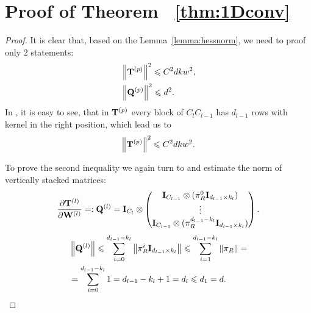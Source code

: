 \documentclass[conference]{IEEEtran}
\begin{document}
\section{Proof of Theorem ~\ref{thm:1Dconv}}\label{app:thm:1Dconv}
\begin{proof}
It is clear that, based on the Lemma~\ref{lemma:hessnorm}, we need to proof only 2 statements:
\begin{align*}
 & \left\|\mathbf{T}^{(p)}\right\|^2 \leqslant C^2dkw^2, \\
 &\left\|\mathbf{Q}^{(p)}\right\|^2 \leqslant d^2.
\end{align*}
In \cite{singh2023hessianperspectivenatureconvolutional}, it is easy to see, that in $\mathbf{T}^{(p)}$ every block of $C_lC_{l-1}$ has $d_{l-1}$ rows with kernel in the right position, which lead us to 
\[\left\|\mathbf{T}^{(p)}\right\|^2 \leqslant C^2dkw^2.\]

To prove the second inequality we again turn to \cite{singh2023hessianperspectivenatureconvolutional} and estimate the norm of vertically stacked matrices: \\
\[\frac{\partial \mathbf{T}^{(l)}}{\partial \mathbf{W}^{(l)}} =: \mathbf{Q}^{(l)} = \mathbf{I}_{C_l} \otimes
    \begin{pmatrix}
        \mathbf{I}_{C_{l-1}} \otimes (\pi_R^0\mathbf{I}_{d_{l-1} \times k_l}) \\
        \vdots \\
        \mathbf{I}_{C_{l-1}} \otimes (\pi_R^{d_{l-1} - k_l}\mathbf{I}_{d_{l-1} \times k_l})
    \end{pmatrix}.
\]
\begin{align*}
& \left\|\mathbf{Q}^{(l)}\right\| \leqslant \sum\limits_{i=0}^{d_{l-1} - k_l}\left\|\pi_R^i\mathbf{I}_{d_{l-1} \times k_l}\right\| \leqslant \sum\limits_{i=1}^{d_{l-1} - k_l}\left\|\pi_R\right\| = \\
&= \sum\limits_{i=0}^{d_{l-1}-k_l} 1 = d_{l-1} - k_l + 1 = d_l \leqslant d_1 = d. \\
\end{align*}
\end{proof}
\end{document}
